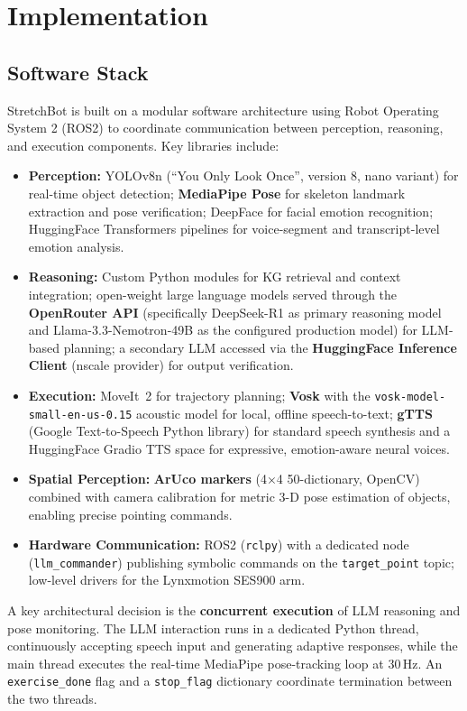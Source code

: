 \section{Implementation}
\label{sec:implementation}

\subsection{Software Stack}

StretchBot is built on a modular software architecture using Robot Operating System 2 (ROS2) to coordinate communication between perception, reasoning, and execution components. Key libraries include:

\begin{itemize}
\item \textbf{Perception:} YOLOv8n (``You Only Look Once'', version 8, nano variant) for real-time object detection; \textbf{MediaPipe Pose} for skeleton landmark extraction and pose verification; DeepFace for facial emotion recognition; HuggingFace Transformers pipelines for voice-segment and transcript-level emotion analysis.
\item \textbf{Reasoning:} Custom Python modules for KG retrieval and context integration; open-weight large language models served through the \textbf{OpenRouter API} (specifically DeepSeek-R1 as primary reasoning model and Llama-3.3-Nemotron-49B as the configured production model) for LLM-based planning; a secondary LLM accessed via the \textbf{HuggingFace Inference Client} (nscale provider) for output verification.
\item \textbf{Execution:} MoveIt~2 for trajectory planning; \textbf{Vosk} with the \texttt{vosk-model-small-en-us-0.15} acoustic model for local, offline speech-to-text; \textbf{gTTS} (Google Text-to-Speech Python library) for standard speech synthesis and a HuggingFace Gradio TTS space for expressive, emotion-aware neural voices.
\item \textbf{Spatial Perception:} \textbf{ArUco markers} (4×4 50-dictionary, OpenCV) combined with camera calibration for metric 3-D pose estimation of objects, enabling precise pointing commands.
\item \textbf{Hardware Communication:} ROS2 (\texttt{rclpy}) with a dedicated node (\texttt{llm\_commander}) publishing symbolic commands on the \texttt{target\_point} topic; low-level drivers for the Lynxmotion SES900 arm.
\end{itemize}

A key architectural decision is the \textbf{concurrent execution} of LLM reasoning and pose monitoring. The LLM interaction runs in a dedicated Python thread, continuously accepting speech input and generating adaptive responses, while the main thread executes the real-time MediaPipe pose-tracking loop at 30\,Hz. An \texttt{exercise\_done} flag and a \texttt{stop\_flag} dictionary coordinate termination between the two threads.

